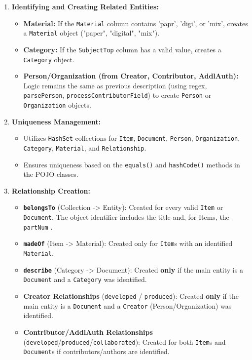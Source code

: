 \begin{enumerate}
    \item \textbf{Identifying and Creating Related Entities:}
        \begin{itemize}
            \item \textbf{Material:} If the \texttt{Material} column contains 'papr', 'digi', or 'mix', creates a \texttt{Material} object ("paper", "digital", "mix").
            \item \textbf{Category:} If the \texttt{SubjectTop} column has a valid value, creates a \texttt{Category} object.
            \item \textbf{Person/Organization (from Creator, Contributor, AddlAuth):} Logic remains the same as previous description (using regex, \texttt{parsePerson}, \texttt{processContributorField}) to create \texttt{Person} or \texttt{Organization} objects.
        \end{itemize}

    \item \textbf{Uniqueness Management:}
        \begin{itemize}
            \item Utilizes \texttt{HashSet} collections for \texttt{Item}, \texttt{Document}, \texttt{Person}, \texttt{Organization}, \texttt{Category}, \texttt{Material}, and \texttt{Relationship}.
            \item Ensures uniqueness based on the \texttt{equals()} and \texttt{hashCode()} methods in the POJO classes.
        \end{itemize}

    \item \textbf{Relationship Creation:}
        \begin{itemize}
            \item \textbf{\texttt{belongsTo}} (Collection -> Entity): Created for every valid \texttt{Item} or \texttt{Document}. The object identifier includes the title and, for Items, the \texttt{partNum} .
            \item \textbf{\texttt{madeOf}} (Item -> Material): Created only for \texttt{Item}s with an identified \texttt{Material}.
            \item \textbf{\texttt{describe}} (Category -> Document): Created \textbf{only} if the main entity is a \texttt{Document} and a \texttt{Category} was identified.
            \item \textbf{Creator Relationships} (\texttt{developed} / \texttt{produced}): Created \textbf{only} if the main entity is a \texttt{Document} and a \texttt{Creator} (Person/Organization) was identified.
            \item \textbf{Contributor/AddlAuth Relationships} (\texttt{developed}/\texttt{produced}/\texttt{collaborated}): Created for both \texttt{Item}s and \texttt{Document}s if contributors/authors are identified.
        \end{itemize}


\end{enumerate}
